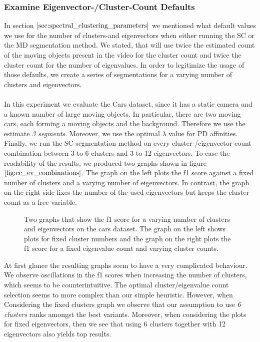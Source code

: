 \subsubsection{Examine Eigenvector-/Cluster-Count Defaults}
In section $\ref{sec:spectral_clustering_parameters}$ we mentioned what default values we use for the number of clusters-and eigenvectors when either running the SC or the MD segmentation method. We stated, that will use twice the estimated count of the moving objects present in the video for the cluster count and twice the cluster count for the number of eigenvalues. In order to legitimize the usage of those defaults, we create a series of segmentations for a varying number of clusters and eigenvectors. \\ \\
In this experiment we evaluate the Cars dataset, since it has a static camera and a known number of large moving objects. In particular, there are two moving cars, each forming a moving objects and the background. Therefore we use the estimate \textit{3 segments}. Moreover, we use the optimal $\lambda$ value for PD affinities. Finally, we run the SC segmentation method on every cluster-/eigenvector-count combination between 3 to 6 clusters and 3 to 12 eigenvectors. To ease the readability of the results, we produced two graphs shown in figure $\ref{fig:cc_ev_combinations}$. The graph on the left plots the f1 score against a fixed number of clusters and a varying number of eigenvectors. In contrast, the graph on the right side fixes the number of the used eigenvectors but keeps the cluster count as a free variable.
\begin{figure}[H]
\begin{center}
\end{center}
\caption[Varying number of Clusters / Eigenvectors]{Two graphs that show the f1 score for a varying number of clusters and eigenvectors on the cars dataset. The graph on the left shows plots for fixed cluster numbers and the graph on the right plots the f1 score for a fixed eigenvalue count and varying cluster counts.}
\label{fig:cc_ev_combinations}
\end{figure}
At first glance the resulting graphs seem to have a very complicated behaviour. We observe oscillations in the f1 scores when increasing the number of clusters, which seems to be counterintuitive. The optimal cluster/eigenvalue count selection seems to more complex than our simple heuristic. However, when Considering the fixed clusters graph we observe that our assumption to use \textit{6 clusters} ranks amongst the best variants. Moreover, when considering the plots for fixed eigenvectors, then we see that using 6 clusters together with 12 eigenvectors also yields top results. \\ \\
